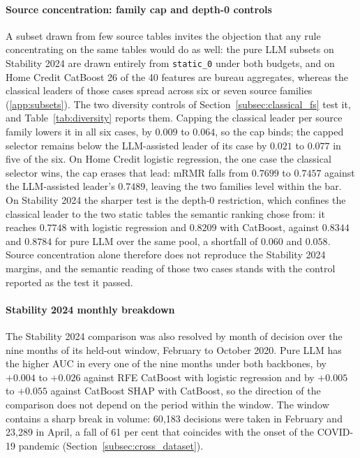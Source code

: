 \documentclass[final,5p,twocolumn]{elsarticle}
\providecommand{\DIFaddtex}[1]{{\protect\color{blue} \sf #1}} %
\providecommand{\DIFaddFL}[1]{\DIFadd{#1}} %
\providecommand{\DIFadd}[1]{\texorpdfstring{\DIFaddtex{#1}}{#1}} %
\begin{document}
\paragraph{\DIFaddFL{Source concentration: family cap and depth-0 controls}}
\DIFaddFL{A subset drawn from few source tables invites the objection that any rule concentrating on the same tables would do as well: the pure LLM subsets on Stability 2024 are drawn entirely from \texttt{static\_0} under both budgets, and on Home Credit CatBoost 26 of the 40 features are bureau aggregates, whereas the classical leaders of those cases spread across six or seven source families (\ref{app:subsets}). The two diversity controls of Section~\ref{subsec:classical_fs} test it, and Table~\ref{tab:diversity} reports them. Capping the classical leader per source family lowers it in all six cases, by $0.009$ to $0.064$, so the cap binds; the capped selector remains below the LLM-assisted leader of its case by $0.021$ to $0.077$ in five of the six. On Home Credit logistic regression, the one case the classical selector wins, the cap erases that lead: mRMR falls from $0.7699$ to $0.7457$ against the LLM-assisted leader's $0.7489$, leaving the two families level within the bar. On Stability 2024 the sharper test is the depth-0 restriction, which confines the classical leader to the two static tables the semantic ranking chose from: it reaches $0.7748$ with logistic regression and $0.8209$ with CatBoost, against $0.8344$ and $0.8784$ for pure LLM over the same pool, a shortfall of $0.060$ and $0.058$. Source concentration alone therefore does not reproduce the Stability 2024 margins, and the semantic reading of those two cases stands with the control reported as the test it passed.
}

\paragraph{\DIFaddFL{Stability 2024 monthly breakdown}}
\DIFaddFL{The Stability 2024 comparison was also resolved by month of decision over the nine months of its held-out window, February to October 2020. Pure LLM has the higher AUC in every one of the nine months under both backbones, by $+0.004$ to $+0.026$ against RFE CatBoost with logistic regression and by $+0.005$ to $+0.055$ against CatBoost SHAP with CatBoost, so the direction of the comparison does not depend on the period within the window. The window contains a sharp break in volume: 60,183 decisions were taken in February and 23,289 in April, a fall of 61 per cent that coincides with the onset of the COVID-19 pandemic (Section~\ref{subsec:cross_dataset}).
}
\end{document}
